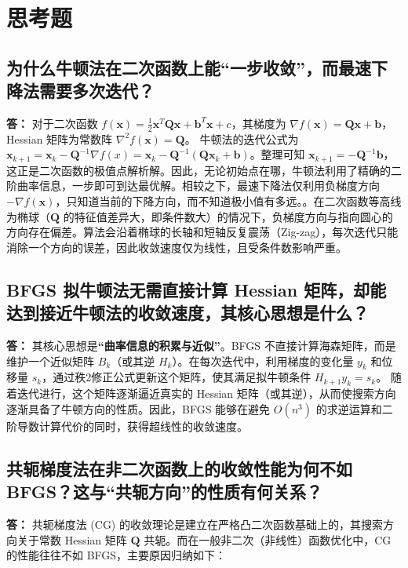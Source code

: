 \documentclass[a4paper,12pt]{article}
\begin{document}
\section{思考题}

\subsection{为什么牛顿法在二次函数上能“一步收敛”，而最速下降法需要多次迭代？}
\textbf{答：} 
对于二次函数 $f(\bm{x}) = \frac{1}{2}\bm{x}^T \bm{Q} \bm{x} + \bm{b}^T \bm{x} + c$，其梯度为 $\nabla f(\bm{x}) = \bm{Q}\bm{x} + \bm{b}$，Hessian 矩阵为常数阵 $\nabla^2 f(\bm{x}) = \bm{Q}$。
牛顿法的迭代公式为 $\bm{x}_{k+1} =\bm{x}_k - \bm{Q}^{-1}\nabla f(x)= \bm{x}_k - \bm{Q}^{-1}(\bm{Q}\bm{x}_k + \bm{b})$。整理可知 $\bm{x}_{k+1} = -\bm{Q}^{-1}\bm{b}$，这正是二次函数的极值点解析解。因此，无论初始点在哪，牛顿法利用了精确的二阶曲率信息，一步即可到达最优解。相较之下，最速下降法仅利用负梯度方向 $-\nabla f(\bm{x})$，只知道当前的下降方向，而不知道极小值有多远。。在二次函数等高线为椭球（$\bm{Q}$ 的特征值差异大，即条件数大）的情况下，负梯度方向与指向圆心的方向存在偏差。算法会沿着椭球的长轴和短轴反复震荡（Zig-zag），每次迭代只能消除一个方向的误差，因此收敛速度仅为线性，且受条件数影响严重。

\subsection{BFGS 拟牛顿法无需直接计算 Hessian 矩阵，却能达到接近牛顿法的收敛速度，其核心思想是什么？}
\textbf{答：}
其核心思想是\textbf{“曲率信息的积累与近似”}。BFGS 不直接计算海森矩阵，而是维护一个近似矩阵 $B_k$（或其逆 $H_k$）。在每次迭代中，利用梯度的变化量 $y_k$ 和位移量 $s_k$，通过秩2修正公式更新这个矩阵，使其满足拟牛顿条件 $H_{k+1} y_k = s_k$。
随着迭代进行，这个矩阵逐渐逼近真实的 Hessian 矩阵（或其逆），从而使搜索方向逐渐具备了牛顿方向的性质。因此，BFGS 能够在避免 $O(n^3)$ 的求逆运算和二阶导数计算代价的同时，获得超线性的收敛速度。

\subsection{共轭梯度法在非二次函数上的收敛性能为何不如 BFGS？这与“共轭方向”的性质有何关系？}
\textbf{答：}
共轭梯度法 (CG) 的收敛理论是建立在严格凸二次函数基础上的，其搜索方向关于常数 Hessian 矩阵 $\bm{Q}$ 共轭。而在一般非二次（非线性）函数优化中，CG 的性能往往不如 BFGS，主要原因归纳如下：
\end{document}

